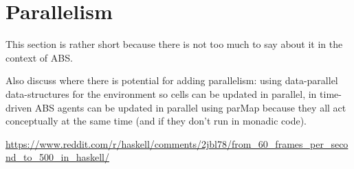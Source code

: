 \section{Parallelism}
This section is rather short because there is not too much to say about it in the context of ABS. 

Also discuss where there is potential for adding parallelism: using data-parallel data-structures for the environment so cells can be updated in parallel, in time-driven ABS agents can be updated in parallel using parMap because they all act conceptually at the same time (and if they don't run in monadic code).

\url{https://www.reddit.com/r/haskell/comments/2jbl78/from_60_frames_per_second_to_500_in_haskell/}